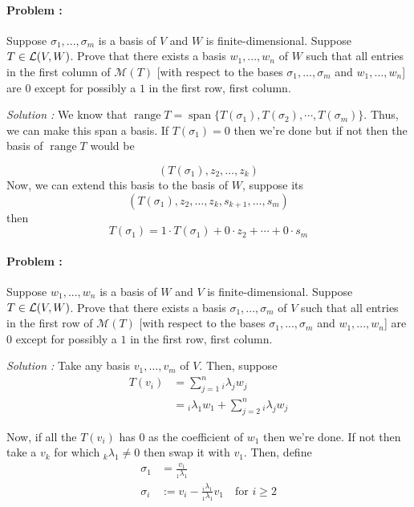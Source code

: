 \paragraph{Problem :}
Suppose \(\sigma_{1},...,\sigma_{m}\) is a basis of \(V\) and \(W\) is finite-dimensional. Suppose \(T\in\operatorname{\mathcal{L}}(V,W)\). Prove that there 
exists a basis \(w_{1},...,w_{n}\) of \(W\) such that all entries in the first column of \(\mathcal{M}(T)\) [with respect to the bases 
\(\sigma_{1},...,\sigma_{m}\) and \(w_{1},...,w_{n}\)] are \(0\) except for possibly a \(1\) in the first row, first column.

\vspace{4mm}
\textit{Solution :} We know that $\operatorname{range}T =  \operatorname{span}\{T(\sigma_1),T(\sigma_2),\cdots,T(\sigma_m)\}$. 
Thus, we can make this span a basis. If $T(\sigma_1)=0$ then we're done but if not then the basis of $\operatorname{range} T$ would be

\[ (T(\sigma_1),z_2, \ldots, z_k) \]
Now, we can extend this basis to the basis of $W$, suppose its \[ (T(\sigma_1),z_2,\ldots,z_k,s_{k+1},\ldots,s_m) \] then
\[T(\sigma_1) = 1 \cdot T(\sigma_1) + 0 \cdot z_2 + \cdots + 0 \cdot s_m \]

\paragraph{Problem :}
Suppose \(w_{1},...,w_{n}\) is a basis of \(W\) and \(V\) is finite-dimensional. Suppose \(T\in\operatorname{\mathcal{L}}(V,W)\). Prove that there exists 
a basis \(\sigma_{1},...,\sigma_{m}\) of \(V\) such that all entries in the first row of \(\mathcal{M}(T)\) [with respect to the bases 
\(\sigma_{1},...,\sigma_{m}\) and \(w_{1},...,w_{n}\)] are \(0\) except for possibly a \(1\) in the first row, first column.

\vspace{4mm}
\textit{Solution :} Take any basis $v_1, \ldots, v_m$ of $V$. Then, suppose 
\begin{align*}
    T(v_i) &= \sum_{j=1}^{n} {}_{i} \lambda_{j} w_j \\
    &= {}_{i}\lambda_{1} w_1 + \sum_{j=2}^{n} {}_{i} \lambda_{j} w_j
\end{align*}

Now, if all the $T(v_i)$ has $0$ as the coefficient of $w_1$ then we're done. If not then take a $v_k$ for which ${}_{k}\lambda_1 \neq 0$
then swap it with $v_1$.
Then, define
\begin{align*}
    \sigma_1 &= \frac{v_1}{{}_{1}\lambda_1} \\
    \sigma_i &:= v_i-\frac{{}_{i}\lambda_1}{{}_{1}\lambda_1} v_1 \quad \text{for } i \ge 2  
\end{align*}

